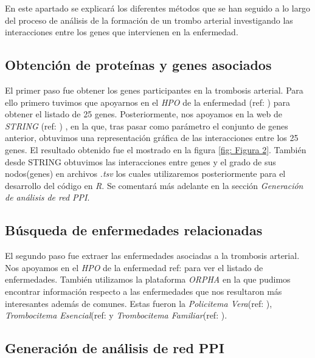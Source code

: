 
En este apartado se explicará los diferentes métodos que se han seguido a lo largo del proceso de análisis de la formación de un trombo arterial investigando las interacciones entre los genes que intervienen en la enfermedad.

\subsection{Obtención de proteínas y genes asociados}

El primer paso fue obtener los genes participantes en la trombosis arterial. Para ello primero tuvimos que apoyarnos en el \textit{HPO} de la enfermedad (ref: \cite{HPO}) para obtener el listado de 25 genes. Posteriormente, nos apoyamos en la web de \textit{STRING} (ref: \cite{STRING}) , en la que, tras pasar como parámetro el conjunto de genes anterior, obtuvimos una representación gráfica de las interacciones entre los 25 genes. El resultado obtenido fue el mostrado en la figura \ref{fig: Figura 2}. También desde STRING obtuvimos las interacciones entre genes y el grado de sus nodos(genes) en archivos \textit{.tsv} los cuales utilizaremos posteriormente para el desarrollo del código en \textit{R}. Se comentará más adelante en la sección \textit{Generación de análisis de red PPI}. \\

\subsection{Búsqueda de enfermedades relacionadas}

El segundo paso fue extraer las enfermedades asociadas a la trombosis arterial. Nos apoyamos en el \textit{HPO} de la enfermedad {ref: \cite{HPO} para ver el listado de enfermedades. También utilizamos la plataforma \textit{ORPHA} en la que pudimos encontrar información respecto a las enfermedades que nos resultaron más interesantes además de comunes. Estas fueron la \textit{Policitema Vera}(ref: \cite{Policitema_Vera}), \textit{Trombocitema Esencial}(ref: \cite{Trombocitema_Esencial}} y \textit{Trombocitema Familiar}(ref: \cite{Trombocitema_Familiar}). 

	
	\subsection{Generación de análisis de red PPI}

